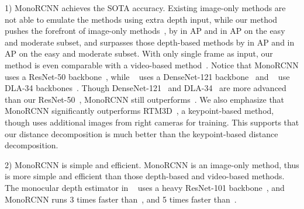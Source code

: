 \documentclass[10pt,twocolumn,letterpaper]{article}
\begin{document}
1) MonoRCNN achieves the SOTA accuracy. Existing image-only methods are not able to emulate the methods using extra depth input, while our method pushes the forefront of image-only methods~\cite{DBLP:conf/eccv/SimonelliBPRK20}, by  in AP and  in AP on the easy and moderate subset, 
and surpasses those depth-based methods by  in AP and  in AP on the easy and moderate subset. With only single frame as input, our method is even comparable with a video-based method~\cite{DBLP:conf/eccv/BrazilPLS20}. Notice that MonoRCNN uses a ResNet-50 backbone~\cite{DBLP:conf/cvpr/HeZRS16}, while ~\cite{DBLP:conf/iccv/Brazil019} uses a DenseNet-121 backbone~\cite{DBLP:conf/cvpr/HuangLMW17} and ~\cite{DBLP:conf/cvpr/ChenTSL20,DBLP:conf/eccv/LiZLC20} use DLA-34 backbones~\cite{DBLP:conf/cvpr/YuWSD18}. Though DenseNet-121~\cite{DBLP:conf/cvpr/HuangLMW17} and DLA-34~\cite{DBLP:conf/cvpr/YuWSD18} are more advanced than our ResNet-50~\cite{DBLP:conf/cvpr/HeZRS16}, MonoRCNN still outperforms~\cite{DBLP:conf/iccv/Brazil019,DBLP:conf/cvpr/ChenTSL20,DBLP:conf/eccv/LiZLC20}. We also emphasize that MonoRCNN significantly outperforms RTM3D~\cite{DBLP:conf/eccv/LiZLC20}, a keypoint-based method, though \cite{DBLP:conf/eccv/LiZLC20} uses additional images from right cameras for training. This supports that our distance decomposition is much better than the keypoint-based distance decomposition.

2) MonoRCNN is simple and efficient. MonoRCNN is an image-only method, thus is more simple and efficient than those depth-based and video-based methods. The monocular depth estimator in ~\cite{DBLP:conf/cvpr/DingHYWSLL20a,DBLP:conf/iccv/MaWLZOF19,DBLP:conf/eccv/YeDSLTFDW20,DBLP:conf/eccv/MaLXZZO20} uses a heavy ResNet-101 backbone~\cite{DBLP:conf/cvpr/HeZRS16}, and MonoRCNN runs \num{3} times faster than~\cite{DBLP:conf/cvpr/DingHYWSLL20a}, and \num{5} times faster than~\cite{DBLP:conf/iccv/MaWLZOF19,DBLP:conf/eccv/YeDSLTFDW20,DBLP:conf/eccv/MaLXZZO20}.
\end{document}
